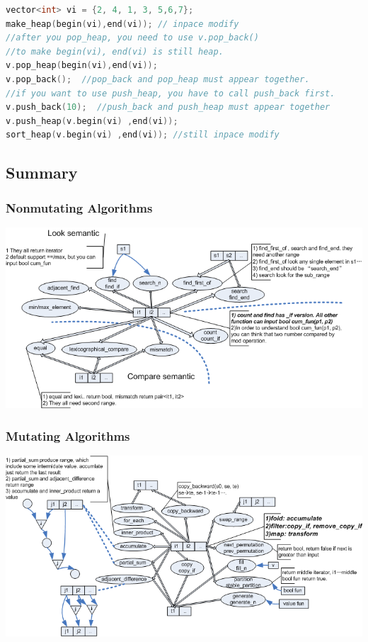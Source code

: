 \documentclass[a4paper,11pt,twoside]{book}
\begin{document}
\begin{lstlisting}[frame=single, language=c++, mathescape=true]
vector<int> vi = {2, 4, 1, 3, 5,6,7};
make_heap(begin(vi),end(vi)); // inpace modify
//after you pop_heap, you need to use v.pop_back()
//to make begin(vi), end(vi) is still heap. 
v.pop_heap(begin(vi),end(vi));
v.pop_back();  //pop_back and pop_heap must appear together.
//if you want to use push_heap, you have to call push_back first. 
v.push_back(10);  //push_back and push_heap must appear together
v.push_heap(v.begin(vi) ,end(vi));
sort_heap(v.begin(vi) ,end(vi)); //still inpace modify
\end{lstlisting}

\subsection{Summary}
\subsubsection{Nonmutating Algorithms}

	\begin{center}
		\includegraphics[width=1.0\linewidth]{pics/stl1.png}
	\end{center}
	
\subsubsection{Mutating Algorithms}
	\begin{center}
		\includegraphics[width=1.0\linewidth]{pics/stl2.png}
	\end{center}
\end{document}

